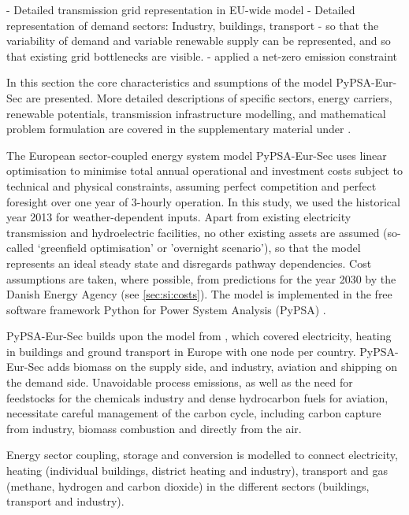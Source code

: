 - Detailed transmission grid representation in EU-wide model
- Detailed representation of demand sectors: Industry, buildings, transport
- so that the variability of demand and variable renewable supply can be represented, and so that existing grid bottlenecks are visible.
- applied a net-zero emission constraint

In this section the core characteristics and ssumptions of the model
PyPSA-Eur-Sec are presented. More detailed descriptions of specific sectors,
energy carriers, renewable potentials, transmission infrastructure modelling,
and mathematical problem formulation are covered in the supplementary material
under .

The European sector-coupled energy system model PyPSA-Eur-Sec uses linear
optimisation to minimise total annual operational and investment costs subject
to technical and physical constraints, assuming perfect competition and perfect
foresight over one year of 3-hourly operation. In this study, we used the
historical year 2013 for weather-dependent inputs. Apart from existing
electricity transmission and hydroelectric facilities, no other existing assets
are assumed (so-called `greenfield optimisation' or 'overnight scenario'), so
that the model represents an ideal steady state and disregards pathway
dependencies.  Cost assumptions are taken, where possible, from predictions for
the year 2030 by the Danish Energy Agency \cite{dea2019} (see
\cref{sec:si:costs}). The model is implemented in the free software framework
Python for Power System Analysis (PyPSA) \cite{brownPyPSAPython2018}.

PyPSA-Eur-Sec builds upon the model from \cite{brownSynergiesSector2018}, which
covered electricity, heating in buildings and ground transport in Europe with
one node per country. PyPSA-Eur-Sec adds biomass on the supply side, and
industry, aviation and shipping on the demand side. Unavoidable process
emissions, as well as the need for feedstocks for the chemicals industry and
dense hydrocarbon fuels for aviation, necessitate careful management of the
carbon cycle, including carbon capture from industry, biomass combustion and
directly from the air.

Energy sector coupling, storage and conversion is modelled to connect
electricity, heating (individual buildings, district heating and industry),
transport and gas (methane, hydrogen and carbon dioxide) in the different
sectors (buildings, transport and industry).

